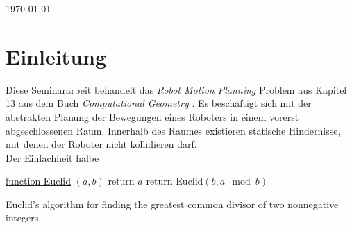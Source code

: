 \documentclass[12pt,a4paper,titlepage]{article}
\begin{document}
\begin{titlepage}
\label{Date}
{\large \today}\\[3cm] %

\label{Logo}
 

\vfill %
\end{titlepage}

\section{Einleitung}
\label{01: Einleitung}
Diese Seminararbeit behandelt das \textit{Robot Motion Planning} Problem aus  Kapitel 13 aus dem Buch \textit{Computational Geometry} \cite{bla}.
Es beschäftigt sich mit der abstrakten Planung der Bewegungen eines Roboters in einem vorerst abgeschlossenen Raum. Innerhalb des Raumes existieren statische Hindernisse, mit denen der Roboter nicht kollidieren darf.\\[.2cm]
Der Einfachheit halbe




\label{alg: Test}
\begin{algorithm}

    \underline{function Euclid} $(a,b)$\;
      {
        return $a$\;
      }
      {
        return Euclid$(b,a\mod b)$\;
      }
    \caption{Euclid's algorithm for finding the greatest common divisor of two nonnegative integers}
\end{algorithm}
\end{document}
